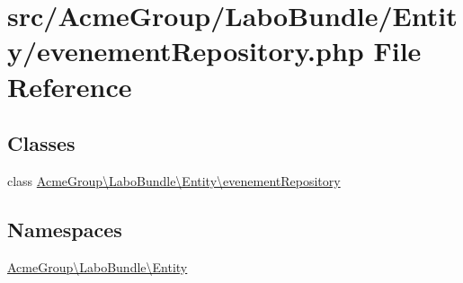 \hypertarget{evenement_repository_8php}{\section{src/\+Acme\+Group/\+Labo\+Bundle/\+Entity/evenement\+Repository.php File Reference}
\label{evenement_repository_8php}
}
\subsection*{Classes}
\begin{DoxyCompactItemize}
\item 
class \hyperlink{class_acme_group_1_1_labo_bundle_1_1_entity_1_1evenement_repository}{Acme\+Group\textbackslash{}\+Labo\+Bundle\textbackslash{}\+Entity\textbackslash{}evenement\+Repository}
\end{DoxyCompactItemize}
\subsection*{Namespaces}
\begin{DoxyCompactItemize}
\item 
 \hyperlink{namespace_acme_group_1_1_labo_bundle_1_1_entity}{Acme\+Group\textbackslash{}\+Labo\+Bundle\textbackslash{}\+Entity}
\end{DoxyCompactItemize}
